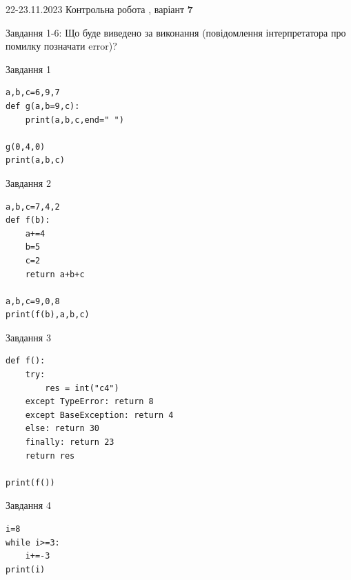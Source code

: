 \documentclass[12pt, ukrainian]{article}
\begin{document}
{{22-23.11.2023 Контрольна робота , варіант  \No \textbf { 7 }\par}}
{

Завдання 1-6: Що буде виведено за виконання (повідомлення інтерпретатора про помилку позначати error)?


\begin{minipage}[t]{9.7cm}                
{\begin{center}Завдання {1}\end{center}}
\begin{verbatim}
a,b,c=6,9,7
def g(a,b=9,c):
    print(a,b,c,end=" ")

g(0,4,0)
print(a,b,c)
\end{verbatim}     
\end{minipage}
\vline \hspace{8mm}
\begin{minipage}[t]{8.0cm}                
{\begin{center}Завдання {2}\end{center}}
\begin{verbatim}
a,b,c=7,4,2
def f(b):
    a+=4
    b=5
    c=2
    return a+b+c

a,b,c=9,0,8
print(f(b),a,b,c)
\end{verbatim}     
\end{minipage}

\vspace{15mm}
\begin{minipage}[t]{9.7cm}                
{\begin{center}Завдання {3}\end{center}}
\begin{verbatim}
def f():
    try:
        res = int("c4")
    except TypeError: return 8
    except BaseException: return 4
    else: return 30
    finally: return 23
    return res

print(f())
\end{verbatim}     
\end{minipage}
\vline \hspace{8mm}
\begin{minipage}[t]{8.0cm}                
{\begin{center}Завдання {4}\end{center}}
\begin{verbatim}
i=8
while i>=3:
    i+=-3
print(i)
\end{verbatim}     
\end{minipage}

}
\end{document}
